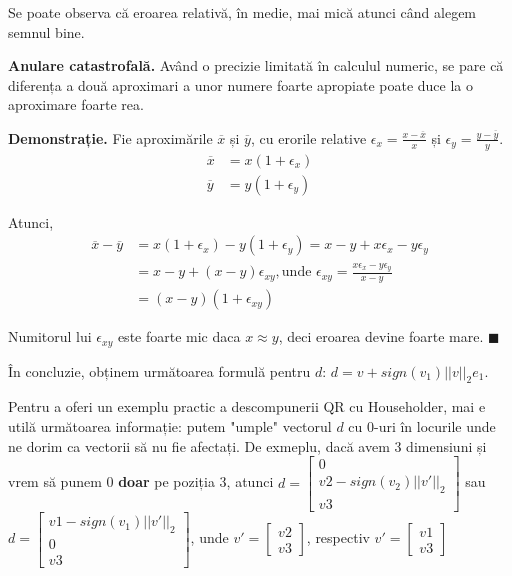\documentclass{exam}
\begin{document}
Se poate observa că eroarea relativă, în medie, mai mică atunci când alegem
semnul bine.

\textbf{Anulare catastrofală.} Având o precizie limitată în calculul
numeric, se pare că diferența a două aproximari a unor numere foarte apropiate
poate duce la o aproximare foarte rea.

\textbf{Demonstrație.} Fie aproximările $\overline{x}$ și $\overline{y}$,
cu erorile relative $\epsilon_x = \frac{x - \overline{x}}{x}$ și $\epsilon_y = \frac{y - \overline{y}}{y}$.
\begin{align*}
	\overline{x} & = x(1 + \epsilon_x) \\
	\overline{y} & = y(1 + \epsilon_y)
\end{align*}

Atunci,
\begin{align*}
	\overline{x} - \overline{y} & = x(1 + \epsilon_x) - y(1 + \epsilon_y) = x - y + x \epsilon_x - y \epsilon_y                           \\
	                            & = x - y + (x - y) \epsilon_{xy}, \text{unde } \epsilon_{xy} = \frac{x \epsilon_x - y \epsilon_y}{x - y} \\
	                            & = (x - y)(1 + \epsilon_{xy})
\end{align*}

Numitorul lui $\epsilon_{xy}$ este foarte mic daca $x \approx y$, deci
eroarea devine foarte mare. $\blacksquare$

În concluzie, obținem următoarea formulă pentru $d$: $d = v + sign(v_1) ||v||_2 e_1$.

Pentru a oferi un exemplu practic a descompunerii QR cu Householder, mai
e utilă următoarea informație: putem "umple" vectorul $d$ cu 0-uri în locurile
unde ne dorim ca vectorii să nu fie afectați. De exmeplu, dacă avem 3 dimensiuni
și vrem să punem 0 \textbf{doar} pe poziția 3, atunci $d = \begin{bmatrix} 0 \\ v2 - sign(v_2) ||v'||_2 \\ v3 \end{bmatrix}$
sau $d = \begin{bmatrix} v1 - sign(v_1) ||v'||_2 \\ 0 \\ v3 \end{bmatrix}$, unde $v' = \begin{bmatrix} v2 \\ v3 \end{bmatrix}$,
respectiv $v' = \begin{bmatrix} v1 \\ v3 \end{bmatrix}$
\end{document}

